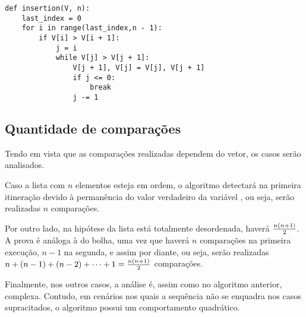 \begin{lstlisting}
def insertion(V, n):
    last_index = 0
    for i in range(last_index,n - 1):
        if V[i] > V[i + 1]:
            j = i
            while V[j] > V[j + 1]:
                V[j + 1], V[j] = V[j], V[j + 1]
                if j <= 0:
                    break
                j -= 1
\end{lstlisting}

\subsection{Quantidade de comparações}
Tendo em vista que as comparações realizadas dependem do vetor, os casos serão analisados. 

Caso a lista com $n$ elementos esteja em ordem, o algoritmo detectará na primeira itineração devido à permanência do valor verdadeiro da variável , ou seja, serão realizadas $n$ comparações.

Por outro lado, na hipótese da lista está totalmente desordenada, haverá $n(n+1)\over 2$. A prova é análoga à do bolha, uma vez que haverá $n$ comparações na primeira execução, $n-1$ na segunda, e assim por diante, ou seja, serão realizadas $n + (n-1)+(n-2)+\cdots+1 = {n(n+1)\over 2}$ comparações.

Finalmente, nos outros casos, a análise é, assim como no algoritmo anterior, complexa. Contudo, em cenários nos quais a sequência não se enquadra nos casos supracitados, o algoritmo possui um comportamento quadrático\cite{insertioncomplexity}.